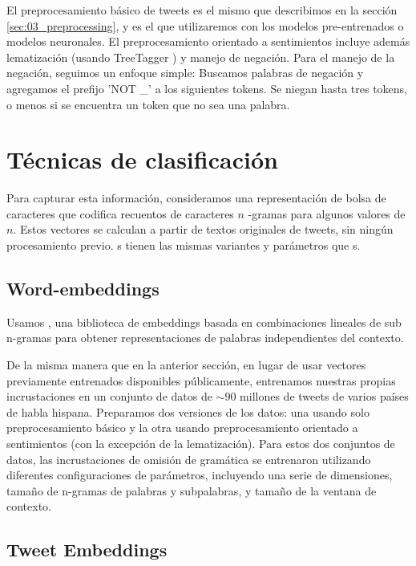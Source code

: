 El preprocesamiento básico de tweets es el mismo que describimos en la sección \ref{sec:03_preprocessing}, y es el que utilizaremos con los modelos pre-entrenados o modelos neuronales. El preprocesamiento orientado a sentimientos incluye además lematización (usando TreeTagger \cite{schmid95}) y manejo de negación.
Para el manejo de la negación, seguimos un enfoque simple:
Buscamos palabras de negación y agregamos el prefijo 'NOT \_' a los siguientes tokens. Se niegan hasta tres tokens, o menos si se encuentra un token que no sea una palabra.

\section{Técnicas de clasificación}

Para capturar esta información, consideramos una representación de bolsa de caracteres que codifica recuentos de caracteres $n$ -gramas para algunos valores de $ n $. Estos vectores se calculan a partir de textos originales de tweets, sin ningún procesamiento previo. \boc {} s tienen las mismas variantes y parámetros que \bow {} s.


\subsection {Word-embeddings}

Usamos \fasttext{}, una biblioteca de embeddings basada en combinaciones lineales de sub n-gramas \cite{bojanowski16} para obtener representaciones de palabras independientes del contexto.


De la misma manera que en la anterior sección, en lugar de usar vectores previamente entrenados disponibles públicamente, entrenamos nuestras propias incrustaciones en un conjunto de datos de $ \sim90 $ millones de tweets de varios países de habla hispana.
Preparamos dos versiones de los datos: una usando solo preprocesamiento básico y la otra usando preprocesamiento orientado a sentimientos (con la excepción de la lematización). Para estos dos conjuntos de datos, las incrustaciones de omisión de gramática se entrenaron utilizando diferentes configuraciones de parámetros, incluyendo una serie de dimensiones, tamaño de n-gramas de palabras y subpalabras, y tamaño de la ventana de contexto.

\subsection{Tweet Embeddings}
\label{sec:sif}

